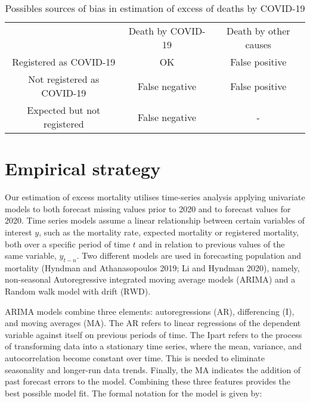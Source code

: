 \documentclass[
]{article}
\begin{document}
\begin{table}[H]
  \centering
  \caption{Possibles sources of bias in estimation of excess of deaths by COVID-19}
  \label{tab:bias}
  \begin{tabular}{ccc}\toprule
                            & Death by COVID-19 & Death by other causes \\ 
Registered as COVID-19      & OK                & False positive        \\ \midrule
Not registered as COVID-19  & False negative    & False positive        \\  
Expected but not registered & False negative    & -                     \\  \bottomrule
\end{tabular}
\end{table}

\hypertarget{emp}{%
\section{Empirical strategy}\label{emp}}

Our estimation of excess mortality utilises time-series analysis applying univariate models to both forecast missing values prior to 2020 and to forecast values for 2020. Time series models assume a linear relationship between certain variables of interest \(y\), such as the mortality rate, expected mortality or registered mortality, both over a specific period of time \(t\) and in relation to previous values of the same variable, \(y_{t-n}\). Two different models are used in forecasting population and mortality (Hyndman and Athanasopoulos 2019; Li and Hyndman 2020), namely, non-seasonal Autoregressive integrated moving average models (\(\text{ARIMA}\)) and a Random walk model with drift (\(\text{RWD}\)).

ARIMA models combine three elements: autoregressions (\(\text{AR}\)), differencing (\(\text{I}\)), and moving averages (\(\text{MA}\)). The \(\text{AR}\) refers to linear regressions of the dependent variable against itself on previous periods of time. The \(\text{I}\)part refers to the process of transforming data into a stationary time series, where the mean, variance, and autocorrelation become constant over time. This is needed to eliminate seasonality and longer-run data trends. Finally, the \(\text{MA}\) indicates the addition of past forecast errors to the model. Combining these three features provides the best possible model fit. The formal notation for the model is given by:
\end{document}
